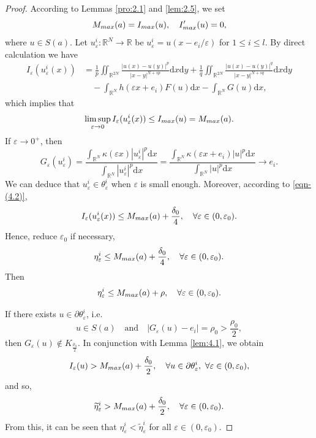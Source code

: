 \documentclass[10pt,a4paper]{amsart}
\numberwithin{equation}{section}
\begin{document}
\begin{proof}According to Lemmas \ref{pro:2.1} and \ref{lem:2.5}, we set
$$
M_{\rm max}(a)=I_{\rm max}(u),\quad I_{\rm max}'(u)=0,
$$
where $u\in S(a)$. Let $u_\varepsilon^{i}:\mathbb{R}^N\to\mathbb{R}$ be 
$u_\varepsilon^{i}=u(x-e_i/\varepsilon)$ for $1\le i\le l$.
By direct calculation we have
\begin{align*}
I_{\varepsilon}(u_\varepsilon^{i}(x))
&= \frac{1}{p}\iint_{\mathbb{R}^{2N}}\frac{|u(x)-u(y)|^{p}}{|x-y|^{N+sp}}\mathrm{d}x\mathrm{d}y+\frac{1}{q}\iint_{\mathbb{R}^{2N}}\frac{|u(x)-u(y)|^{q}}{|x-y|^{N+sq}}\mathrm{d}x\mathrm{d}y\\
&\quad -\int_{\mathbb{R}^N}h(\varepsilon x+e_i)F(u)\mathrm{d}x-\int_{\mathbb{R}^N}G(u)\mathrm{d}x,
\end{align*}
which implies that
\begin{equation}\label{eqn-(4.2)}
\limsup_{\varepsilon\to0}I_{\varepsilon}(u_\varepsilon^{i}(x))
\le I_{\rm max}(u)=M_{\rm max}(a).
\end{equation}
If $\varepsilon\to0^{+}$, then
$$
G_{\varepsilon}(u_\varepsilon^{i})
=\frac{\int_{\mathbb{R}^N}\kappa(\varepsilon x)|u_\varepsilon^{i}|^{p}\mathrm{d}x}
{\int_{\mathbb{R}^N}|u_\varepsilon^{i}|^{p}\mathrm{d}x}
=\frac{\int_{\mathbb{R}^N}\kappa(\varepsilon x+e_i)|u|^{p}\mathrm{d}x}
{\int_{\mathbb{R}^N}|u|^{p}\mathrm{d}x}\to e_i.
$$
 We can deduce that $u_\varepsilon^{i}\in\theta_\varepsilon^{i}$ when 
$\varepsilon$ is small enough. Moreover, according to \eqref{eqn-(4.2)},
$$
I_{\varepsilon}(u_\varepsilon^{i}(x))
\le M_{\rm max}(a)+\frac{\delta_0}{4},\quad\forall\varepsilon\in(0,\varepsilon_0). 
$$
Hence, reduce $\varepsilon_0$ if necessary,
$$
\eta_\varepsilon^{i}\le M_{\rm max}(a)+\frac{\delta_0}{4}, 
\quad\forall\varepsilon\in(0,\varepsilon_0).
$$
Then
$$
\eta_\varepsilon^{i}\le M_{\rm max}(a)+\rho,\quad
\forall\varepsilon\in(0,\varepsilon_0).
$$

If there exists $u\in\partial\theta_\varepsilon^{i}$, i.e.
$$
u\in S(a)\quad \text{and} \quad |G_{\varepsilon}(u)-e_i|=\rho_0>\frac{\rho_0}{2},
$$
then $G_{\varepsilon}(u)\not\in K_{\frac{\rho_0}{2}}$.
 In conjunction with Lemma \ref{lem:4.1}, we obtain
$$
I_\varepsilon(u)>M_{\rm max}(a)+\frac{\delta_0}{2},\quad
\forall u\in\partial\theta_\varepsilon^{i},~\forall \varepsilon\in(0,\varepsilon_0),
$$
and so,
$$
\widetilde\eta_\varepsilon^{i}>M_{\rm max}(a)+\frac{\delta_0}{2},\quad
\forall\varepsilon\in(0,\varepsilon_0).
$$
From this, it can be seen that
$\eta_\varepsilon^{i}<\widetilde\eta_\varepsilon^{i}$ for all 
$\varepsilon\in(0,\varepsilon_0)$.
\end{proof}
\end{document}
